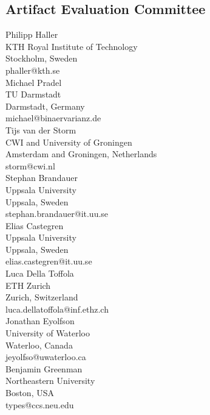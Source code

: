 \documentclass[a4paper,UKenglish]{dartsmaster}
\begin{document}
\begin{participants}

\chapter[Committee]{Artifact Evaluation Committee}
\participant Philipp Haller\\
  KTH Royal Institute of Technology\\
  Stockholm, Sweden\\
  phaller@kth.se\\

\participant Michael Pradel\\
  TU Darmstadt\\
  Darmstadt, Germany\\
  michael@binaervarianz.de\\

\participant Tijs van der Storm\\
  CWI and University of Groningen\\
  Amsterdam and Groningen, Netherlands\\
  storm@cwi.nl\\

\participant Stephan Brandauer\\
  Uppsala University\\
  Uppsala, Sweden\\
  stephan.brandauer@it.uu.se\\

\participant Elias Castegren\\
  Uppsala University\\
  Uppsala, Sweden\\
  elias.castegren@it.uu.se\\

\participant Luca Della Toffola\\
  ETH Zurich\\
  Zurich, Switzerland\\
  luca.dellatoffola@inf.ethz.ch\\

\participant Jonathan Eyolfson\\
  University of Waterloo\\
  Waterloo, Canada\\
  jeyolfso@uwaterloo.ca\\

\participant Benjamin Greenman\\
  Northeastern University\\
  Boston, USA\\
  types@ccs.neu.edu\\


\end{participants}
\end{document}
